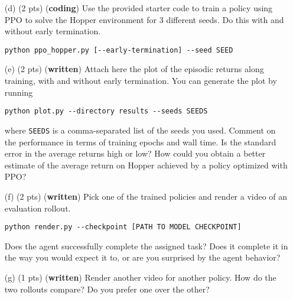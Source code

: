 \documentclass{article}
\begin{document}
\begin{enumerate}

    \item[(d) (2 pts)] (\textbf{coding}) Use the provided starter code to train a policy using PPO to solve the Hopper environment for 3 different seeds. Do this with and without early termination.

\begin{tcolorbox}
\begin{verbatim}
python ppo_hopper.py [--early-termination] --seed SEED
\end{verbatim}
\end{tcolorbox}

    \item[(e) (2 pts)] (\textbf{written}) Attach here the plot of the episodic returns along training, with and without early termination. You can generate the plot by running

\begin{tcolorbox}
\begin{verbatim}
python plot.py --directory results --seeds SEEDS
\end{verbatim}
\end{tcolorbox}
    
    where \texttt{SEEDS} is a comma-separated list of the seeds you used. Comment on the performance in terms of training epochs and wall time. Is the standard error in the average returns high or low? How could you obtain a better estimate of the average return on Hopper achieved by a policy optimized with PPO?

    \item[(f) (2 pts)] (\textbf{written}) Pick one of the trained policies and render a video of an evaluation rollout.

\begin{tcolorbox}
\begin{verbatim}
python render.py --checkpoint [PATH TO MODEL CHECKPOINT]
\end{verbatim}
\end{tcolorbox}

    Does the agent successfully complete the assigned task? Does it complete it in the way you would expect it to, or are you surprised by the agent behavior?

    \item[(g) (1 pts)] (\textbf{written}) Render another video for another policy. How do the two rollouts compare? Do you prefer one over the other?
\end{enumerate}
\end{document}
